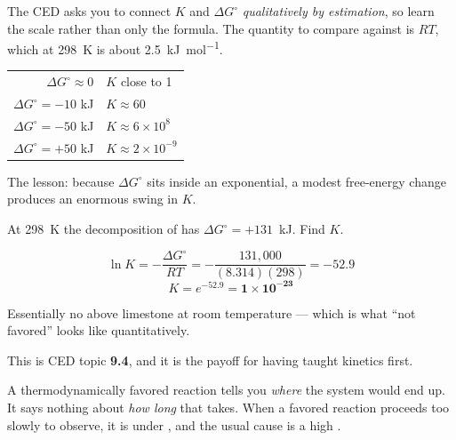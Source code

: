 \documentclass{apchem-notes}
\begin{document}
\begin{apcnote}
The CED asks you to connect $K$ and $\Delta G^\circ$ \emph{qualitatively by
estimation}, so learn the scale rather than only the formula. The quantity
to compare against is $RT$, which at \SI{298}{\kelvin} is about
\SI{2.5}{\kilo\joule\per\mole}.

\begin{center}
\begin{tabular}{@{}rl@{}}
\hline
$\Delta G^\circ \approx 0$ & $K$ close to 1 \\
$\Delta G^\circ = -10$ kJ & $K \approx 60$ \\
$\Delta G^\circ = -50$ kJ & $K \approx 6\times10^{8}$ \\
$\Delta G^\circ = +50$ kJ & $K \approx 2\times10^{-9}$ \\
\hline
\end{tabular}
\end{center}

The lesson: because $\Delta G^\circ$ sits inside an exponential, a modest
free-energy change produces an enormous swing in $K$.
\end{apcnote}

\begin{workedexample}
At \SI{298}{\kelvin} the decomposition of  has
$\Delta G^\circ = +131$~kJ. Find $K$.

\[ \ln K = -\frac{\Delta G^\circ}{RT}
   = -\frac{131{,}000}{(8.314)(298)} = -52.9 \]
\[ K = e^{-52.9} = \mathbf{1\times10^{-23}} \]

Essentially no  above limestone at room temperature --- which is
what ``not favored'' looks like quantitatively.
\end{workedexample}



This is CED topic \textbf{9.4}, and it is the payoff for having taught
kinetics first.

A thermodynamically favored reaction tells you \emph{where} the system would
end up. It says nothing about \emph{how long} that takes. When a favored
reaction proceeds too slowly to observe, it is under
, and the usual cause is a high
.
\end{document}
